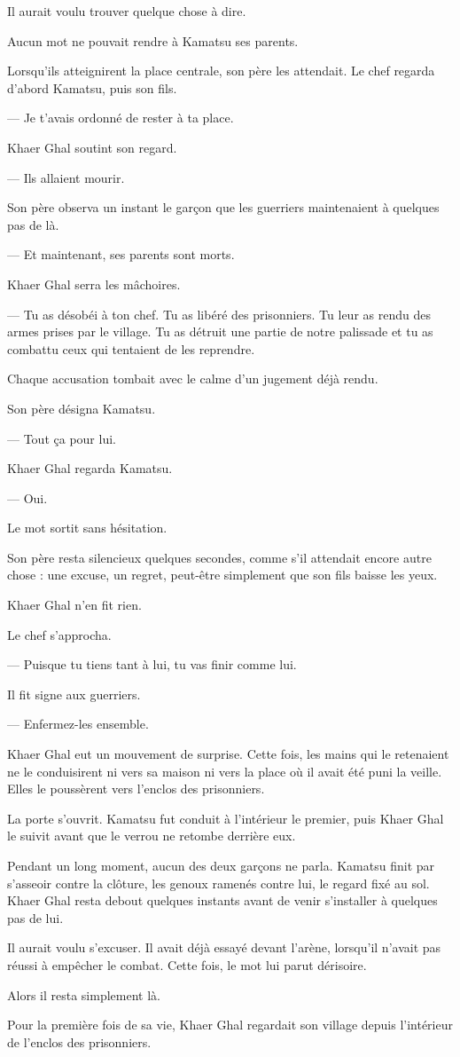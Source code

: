 Il aurait voulu trouver quelque chose à dire.

Aucun mot ne pouvait rendre à Kamatsu ses parents.

Lorsqu'ils atteignirent la place centrale, son père les attendait. Le chef
regarda d'abord Kamatsu, puis son fils.

— Je t'avais ordonné de rester à ta place.

Khaer Ghal soutint son regard.

— Ils allaient mourir.

Son père observa un instant le garçon que les guerriers maintenaient à quelques
pas de là.

— Et maintenant, ses parents sont morts.

Khaer Ghal serra les mâchoires.

— Tu as désobéi à ton chef. Tu as libéré des prisonniers. Tu leur as rendu des
armes prises par le village. Tu as détruit une partie de notre palissade et tu
as combattu ceux qui tentaient de les reprendre.

Chaque accusation tombait avec le calme d'un jugement déjà rendu.

Son père désigna Kamatsu.

— Tout ça pour lui.

Khaer Ghal regarda Kamatsu.

— Oui.

Le mot sortit sans hésitation.

Son père resta silencieux quelques secondes, comme s'il attendait encore autre
chose : une excuse, un regret, peut-être simplement que son fils baisse les
yeux.

Khaer Ghal n'en fit rien.

Le chef s'approcha.

— Puisque tu tiens tant à lui, tu vas finir comme lui.

Il fit signe aux guerriers.

— Enfermez-les ensemble.

Khaer Ghal eut un mouvement de surprise. Cette fois, les mains qui le
retenaient ne le conduisirent ni vers sa maison ni vers la place où il avait
été puni la veille. Elles le poussèrent vers l'enclos des prisonniers.

La porte s'ouvrit. Kamatsu fut conduit à l'intérieur le premier, puis Khaer
Ghal le suivit avant que le verrou ne retombe derrière eux.

Pendant un long moment, aucun des deux garçons ne parla. Kamatsu finit par
s'asseoir contre la clôture, les genoux ramenés contre lui, le regard fixé au
sol. Khaer Ghal resta debout quelques instants avant de venir s'installer à
quelques pas de lui.

Il aurait voulu s'excuser. Il avait déjà essayé devant l'arène, lorsqu'il
n'avait pas réussi à empêcher le combat. Cette fois, le mot lui parut
dérisoire.

Alors il resta simplement là.

Pour la première fois de sa vie, Khaer Ghal regardait son village depuis
l'intérieur de l'enclos des prisonniers.